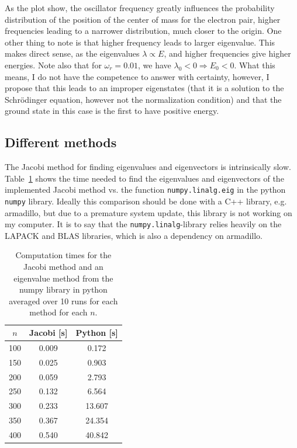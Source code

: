 \documentclass[11pt, a4paper]{article}
\newcommand{\SL}{Schr\"{o}dinger }
\begin{document}
			As the plot show, the oscillator frequency greatly influences the probability distribution of the position of the center of mass for the electron pair, higher frequencies leading to a narrower distribution, much closer to the origin. One other thing to note is that higher frequency leads to larger eigenvalue. This makes direct sense, as the eigenvalues $\lambda\propto E$, and higher frequencies give higher energies. Note also that for $\omega_r=0.01$, we have $\lambda_0<0 \Rightarrow E_0<0$. What this means, I do not have the competence to answer with certainty, however, I propose that this leads to an improper eigenstates (that it is a solution to the \SL equation, however not the normalization condition) and that the ground state in this case is the first to have positive energy. 

		\subsection{Different methods}
			The Jacobi method for finding eigenvalues and eigenvectors is intrinsically slow. Table~\ref{table: tomputation times jacobi vs. numpy} shows the time needed to find the eigenvalues and eigenvectors of the implemented Jacobi method vs. the function \texttt{numpy.linalg.eig} in the python \texttt{numpy} library. Ideally this comparison should be done with a C++ library, e.g. armadillo, but due to a premature system update, this library is not working on my computer. It is to say that the \texttt{numpy.linalg}-library relies heavily on the LAPACK and BLAS libraries, which is also a dependency on armadillo.
			\begin{table}
				\centering
				\caption{Computation times for the Jacobi method and an eigenvalue method from the numpy library in python averaged over 10 runs for each method for each $n$.}
				\label{table: tomputation times jacobi vs. numpy}
				\begin{tabular}{|c|c|c|}
					\hline
					$n$	&	Jacobi [s]	&	Python [s]	\\ \hline
					100	&	0.009	&	0.172	\\
					150	&	0.025	&	0.903	\\
					200	&	0.059	&	2.793	\\
					250	&	0.132	&	6.564	\\
					300	&	0.233	&	13.607	\\
					350	&	0.367	&	24.354	\\
					400	&	0.540	&	40.842	\\ \hline
				\end{tabular}
			\end{table}
			
\end{document}
